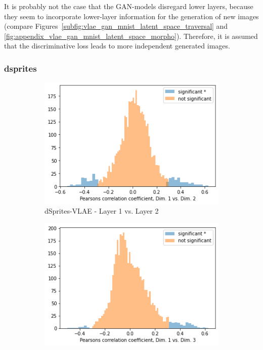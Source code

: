 It is probably not the case that the \ac{GAN}-models disregard lower layers, because they seem to incorporate lower-layer information for the generation of new images (compare Figures~\ref{subfig:vlae_gan_mnist_latent_space_traversal} and \ref{fig:appendix_vlae_gan_mnist_latent_space_morpho}).
Therefore, it is assumed that the discriminative loss leads to more independent generated images.

\subsubsection{dsprites}

\begin{figure}
    \centering
    \begin{subfigure}{.3\textwidth}
        \includegraphics[width=\textwidth]{images/notprop/dsprites/vlae/dim_1_2.png}
        \caption{dSprites-\ac{VLAE} - Layer 1 vs. Layer 2}
    \end{subfigure}
    \hfill
    \begin{subfigure}{.3\textwidth}
        \includegraphics[width=\textwidth]{images/notprop/dsprites/vlae/dim_1_3.png}

\end{subfigure}
\end{figure}
